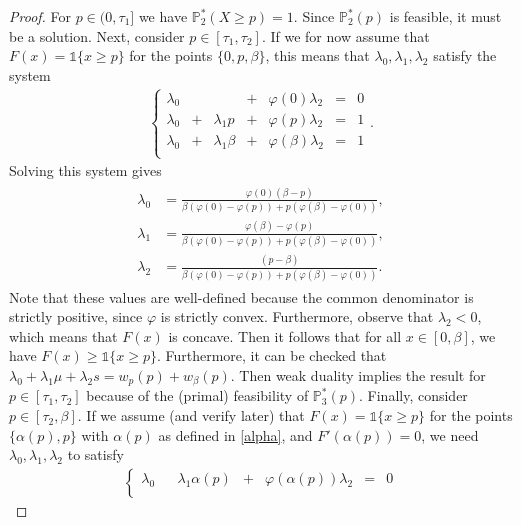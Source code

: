 \documentclass[11pt]{article}
\newcommand{\bP}{\mathbb{P}}
\newcommand{\1}{\mathds{1}}
\begin{document}
\begin{proof}
    For $p \in (0,\tau_1]$ we have $\bP^*_2(X\geq p)=1$. Since $\bP^*_2(p)$ is feasible, it must be a solution. Next, consider $p \in [\tau_1,\tau_2]$. 
If we for now assume that $F(x) = \1{\{x \geq p\}}$ for the points $\{0,p,\beta\}$, this means that $\lambda_0, \lambda_1, \lambda_2$ satisfy the system
\begin{align}
    \left\{
\begin{array}{rrrrrrr}
     \lambda_0 & &  & + & \varphi(0) \lambda_2  &= & 0 \\
      \lambda_0 & + &\lambda_1 p  & + & \varphi(p) \lambda_2  &= & 1 \\
  \lambda_0 & + &\lambda_1 \beta  & + & \varphi(\beta) \lambda_2  &= & 1 \\
\end{array}\right..
\label{eq:equations_dual}
\end{align}
Solving this system gives
\begin{align}
\begin{array}{ll}
 \lambda_0 & = \displaystyle \frac{\varphi(0)(\beta-p)}{\beta(\varphi(0) - \varphi(p)) + p(\varphi(\beta) - \varphi(0))},\\[3.5ex] 
        \lambda_1 & = \displaystyle  \frac{\varphi(\beta) - \varphi(p)}{\beta(\varphi(0) - \varphi(p)) + p(\varphi(\beta) - \varphi(0))},  \\[3.5ex] 
        \lambda_2 & = \displaystyle  \frac{(p-\beta)}{\beta(\varphi(0) - \varphi(p)) + p(\varphi(\beta) - \varphi(0))}.
\end{array}
\label{eq:dual_variables} 
\end{align}
Note that these values are well-defined because the common denominator is strictly positive, since $\varphi$ is strictly convex. Furthermore, observe that $\lambda_2 < 0$, which means that $F(x)$ is concave. Then it follows that for all $x \in [0,\beta]$, we have $F(x) \geq \1{\{x \geq p\}}$. Furthermore, it can be checked that $\lambda_0 + \lambda_1 \mu + \lambda_2 s = w_p(p) + w_\beta(p)$. Then weak duality implies the result for $p \in [\tau_1,\tau_2]$ because of the (primal) feasibility of $\bP^*_3(p)$. Finally, consider $p \in [\tau_2,\beta]$. If we assume (and verify later) that $F(x) = \1{\{x \geq p\}}$ for the points $\{\alpha(p),p\}$ with $\alpha(p)$ as defined in \eqref{alpha}, and $F'(\alpha(p)) = 0$, we need $\lambda_0,\lambda_1,\lambda_2$ to satisfy 
\begin{align}
    \left\{
\begin{array}{rrrrrrr}
     \lambda_0 & & \lambda_1\alpha(p)  & + & \varphi(\alpha(p)) \lambda_2  &= & 0 \\

\end{array}
\end{align}
\end{proof}
\end{document}
